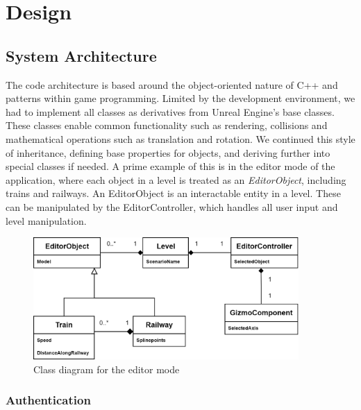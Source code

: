 \section{Design}

\subsection{System Architecture}

The code architecture is based around the object-oriented nature of C++ and patterns within game programming. Limited by the development environment, we had to implement all classes as derivatives from Unreal Engine's base classes. These classes enable common functionality such as rendering, collisions and mathematical operations such as translation and rotation. We continued this style of inheritance, defining base properties for objects, and deriving further into special classes if needed. A prime example of this is in the editor mode of the application, where each object in a level is treated as an \textit{EditorObject}, including trains and railways. An EditorObject is an interactable entity in a level. These can be manipulated by the EditorController, which handles all user input and level manipulation.

\vspace*{1 cm} %

\begin{figure}[!htb]
    \centerline{\includegraphics[width=0.9\textwidth]{figures/EditorERDiagram.png}}
    \caption[size=small]{Class diagram for the editor mode}
\end{figure} 
\vspace*{1 cm} %

\subsubsection{Authentication}

